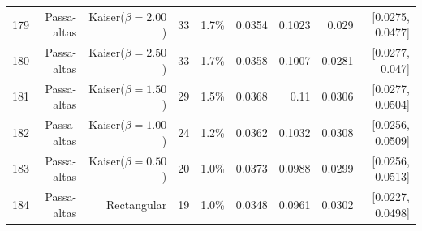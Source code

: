 \begin{longtable}{lrrrrrrrr}
    179 & Passa-altas & Kaiser($\beta=2.00$) & 33 & 1.7\% & 0.0354 & 0.1023 & 0.029 & [0.0275, 0.0477] \\
    180 & Passa-altas & Kaiser($\beta=2.50$) & 33 & 1.7\% & 0.0358 & 0.1007 & 0.0281 & [0.0277, 0.047] \\
    181 & Passa-altas & Kaiser($\beta=1.50$) & 29 & 1.5\% & 0.0368 & 0.11 & 0.0306 & [0.0277, 0.0504] \\
    182 & Passa-altas & Kaiser($\beta=1.00$) & 24 & 1.2\% & 0.0362 & 0.1032 & 0.0308 & [0.0256, 0.0509] \\
    183 & Passa-altas & Kaiser($\beta=0.50$) & 20 & 1.0\% & 0.0373 & 0.0988 & 0.0299 & [0.0256, 0.0513] \\
    184 & Passa-altas & Rectangular & 19 & 1.0\% & 0.0348 & 0.0961 & 0.0302 & [0.0227, 0.0498] \\
    \bottomrule
  \end{longtable}
